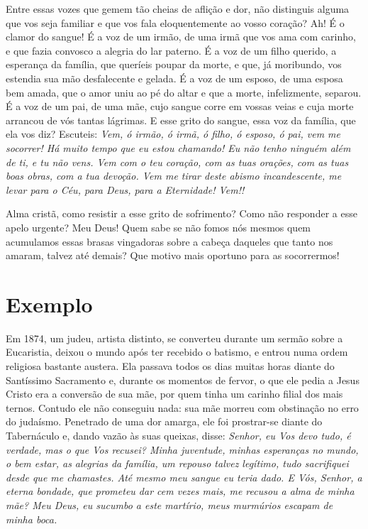 Entre essas vozes que gemem tão cheias de aflição e dor, não distinguis alguma que vos seja familiar e que vos fala eloquentemente ao vosso coração? Ah! É o clamor do sangue! É a voz de um irmão, de uma irmã que vos ama com carinho, e que fazia convosco a alegria do lar paterno. É a voz de um filho querido, a esperança da família, que queríeis poupar da morte, e que, já moribundo, vos estendia sua mão desfalecente e gelada. É a voz de um esposo, de uma esposa bem amada, que o amor uniu ao pé do altar e que a morte, infelizmente, separou. É a voz de um pai, de uma mãe, cujo sangue corre em vossas veias e cuja morte arrancou de vós tantas lágrimas. E esse grito do sangue, essa voz da família, que ela vos diz? Escuteis: \textit{Vem, ó irmão, ó irmã, ó filho, ó esposo, ó pai, vem me socorrer! Há muito tempo que eu estou chamando! Eu não tenho ninguém além de ti, e tu não vens. Vem com o teu coração, com as tuas orações, com as tuas boas obras, com a tua devoção. Vem me tirar deste abismo incandescente, me levar para o Céu, para Deus, para a Eternidade! Vem!!}

Alma cristã, como resistir a esse grito de sofrimento? Como não responder a esse apelo urgente? Meu Deus! Quem sabe se não fomos nós mesmos quem acumulamos essas brasas vingadoras sobre a cabeça daqueles que tanto nos amaram, talvez até demais? Que motivo mais oportuno para as socorrermos! \\


\section*{Exemplo}

Em 1874, um judeu, artista distinto, se converteu durante um sermão sobre a Eucaristia, deixou o mundo após ter recebido o batismo, e entrou numa ordem religiosa bastante austera. Ela passava todos os dias muitas horas diante do Santíssimo Sacramento e, durante os momentos de fervor, o que ele pedia a Jesus Cristo era a conversão de sua mãe, por quem tinha um carinho filial dos mais ternos. Contudo ele não conseguiu nada: sua mãe morreu com obstinação no erro do judaísmo. Penetrado de uma dor amarga, ele foi prostrar-se diante do Tabernáculo e, dando vazão às suas queixas, disse: \textit{Senhor, eu Vos devo tudo, é verdade, mas o que Vos recusei? Minha juventude, minhas esperanças no mundo, o bem estar, as alegrias da família, um repouso talvez legítimo, tudo sacrifiquei desde que me chamastes. Até mesmo meu sangue eu teria dado. E Vós, Senhor, a eterna bondade, que prometeu dar cem vezes mais, me recusou a alma de minha mãe? Meu Deus, eu sucumbo a este martírio, meus murmúrios escapam de minha boca.}

